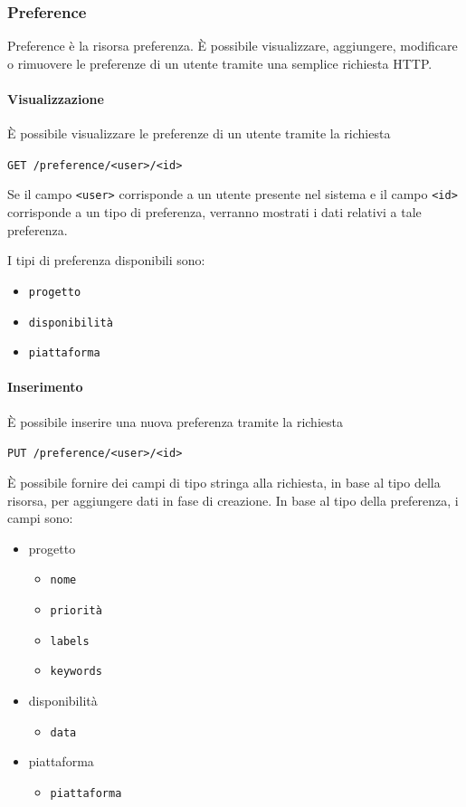 \subsubsection{Preference}
Preference è la risorsa preferenza. È possibile visualizzare, aggiungere, modificare o rimuovere le preferenze di un utente tramite una semplice richiesta HTTP.

\paragraph{Visualizzazione}
È possibile visualizzare le preferenze di un utente tramite la richiesta
    \begin{center}
        \texttt{GET  /preference/<user>/<id>}
    \end{center}
Se il campo \texttt{<user>} corrisponde a un utente presente nel sistema e il campo \texttt{<id>} corrisponde a un tipo di preferenza, verranno mostrati i dati relativi a tale preferenza.

I tipi di preferenza disponibili sono:
\begin{itemize}[noitemsep]
    \item \texttt{progetto}
    \item \texttt{disponibilità}
    \item \texttt{piattaforma}
\end{itemize}

\paragraph{Inserimento}
È possibile inserire una nuova preferenza tramite la richiesta
    \begin{center}
        \texttt{PUT /preference/<user>/<id>}
    \end{center}

È possibile fornire dei campi di tipo stringa alla richiesta, in base al tipo della risorsa, per aggiungere dati in fase di creazione.
In base al tipo della preferenza, i campi sono:
\begin{itemize}[noitemsep]
    \item progetto
        \begin{itemize}[noitemsep]
            \item \texttt{nome}
            \item \texttt{priorità}
            \item \texttt{labels}
            \item \texttt{keywords}
        \end{itemize}
    \item disponibilità
        \begin{itemize}[noitemsep]
            \item \texttt{data}
        \end{itemize}
    \item piattaforma
        \begin{itemize}[noitemsep]
            \item \texttt{piattaforma}
        \end{itemize}
\end{itemize}


